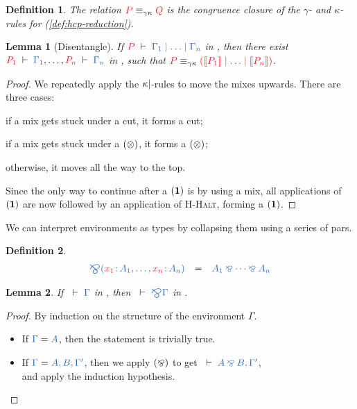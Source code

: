 \documentclass[draft,submission,copyright,creativecommons]{eptcs}
\newtheorem{definition}{Definition}
\newtheorem{lemma}{Lemma}
\begin{document}
\begin{definition}\label{def:hcp-gk}
  The relation $\tm{P}\equiv_{\gamma\kappa}\tm{Q}$ is the congruence closure of
  the $\gamma$- and $\kappa$-rules for \hcp (\cref{def:hcp-reduction}).
\end{definition}

\begin{lemma}[Disentangle]\label{lem:hcp-disentangle}
  If $\seq[P]{\Gamma_1 \hsep \dots \hsep \Gamma_n}$ in \hcp,
  then there exist $\seq[P_1]{\Gamma_1}, \dots, \seq[P_n]{\Gamma_n}$ in \cp,
  such that
  $\tm{P}\equiv_{\gamma\kappa}\tm{(\mtf{P_1}\ppar\dots\ppar\mtf{P_n})}$.
\end{lemma}
\begin{proof}
  We repeatedly apply the $\kappa{\ensuremath{\mid}}$-rules to move the mixes upwards.
  There are three cases:
  \begin{enumerate*}[label={\alph*)}]
  \item
    if a mix gets stuck under a cut, it forms a \cp cut;
  \item
    if a mix gets stuck under a $(\otimes)$, it forms a \cp $(\otimes)$;
  \item
    otherwise, it moves all the way to the top.
  \end{enumerate*}
  Since the only way to continue after a $(\mathbf{1})$ is by using a mix, all
  applications of $(\mathbf{1})$ are now followed by an application of
  \textsc{H-Halt}, forming a \cp $(\mathbf{1})$.
\end{proof}

We can interpret environments as types by collapsing them using a series of
pars.
\begin{definition}\label{def:bigparr}
  \begin{gather*}
  \begin{array}{lcl}
    \ty{\bigparr(\tmty{x_1}{A_1} , \dots , \tmty{x_n}{A_n})}
    & = & \ty{A_1 \parr \dots \parr A_n}
  \end{array}
  \end{gather*}
\end{definition}

\begin{lemma}\label{lem:cp-bigparr}
  If $\seq{\Gamma}$ in \cp, then $\seq{\bigparr\Gamma}$ in \cp.
\end{lemma}
\begin{proof}
  By induction on the structure of the environment $\Gamma$.
  \begin{itemize}
  \item
    If $\ty{\Gamma} = \ty{A}$, then the statement is trivially true.
  \item
    If $\ty{\Gamma} = \ty{A, B, \Gamma'}$,
    then we apply $(\mathbin{\bindnasrepma})$ to get $\seq{A \parr B, \Gamma'}$,\\
    and apply the induction hypothesis.
  \end{itemize}
\end{proof}
\end{document}

